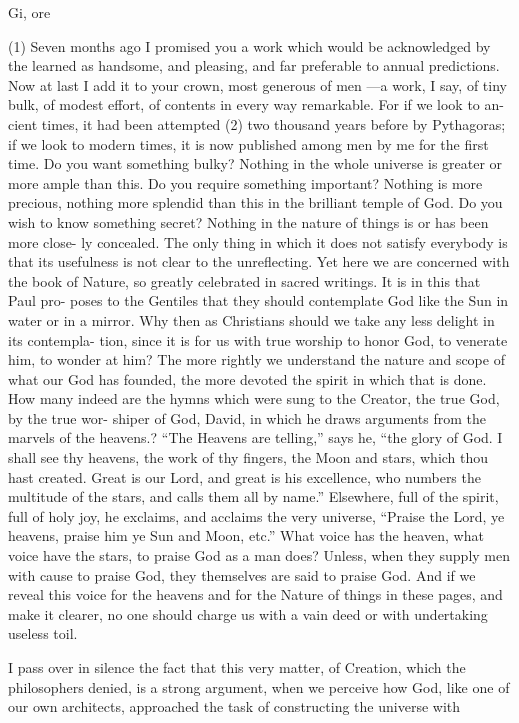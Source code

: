 \documentclass{article}
\begin{document}
{{{{{Gi, ore






(1) Seven months ago I promised you a work which would be acknowledged by
the learned as handsome, and pleasing, and far preferable to annual predictions.
Now at last I add it to your crown, most generous of men —a work, I say, of tiny
bulk, of modest effort, of contents in every way remarkable. For if we look to an-
cient times, it had been attempted (2) two thousand years before by Pythagoras; if
we look to modern times, it is now published among men by me for the first time.
Do you want something bulky? Nothing in the whole universe is greater or more
ample than this. Do you require something important? Nothing is more precious,
nothing more splendid than this in the brilliant temple of God. Do you wish to
know something secret? Nothing in the nature of things is or has been more close-
ly concealed. The only thing in which it does not satisfy everybody is that its
usefulness is not clear to the unreflecting. Yet here we are concerned with the
book of Nature, so greatly celebrated in sacred writings. It is in this that Paul pro-
poses to the Gentiles that they should contemplate God like the Sun in water or in
a mirror. Why then as Christians should we take any less delight in its contempla-
tion, since it is for us with true worship to honor God, to venerate him, to wonder
at him? The more rightly we understand the nature and scope of what our God
has founded, the more devoted the spirit in which that is done. How many indeed
are the hymns which were sung to the Creator, the true God, by the true wor-
shiper of God, David, in which he draws arguments from the marvels of the
heavens.? “The Heavens are telling,” says he, “the glory of God. I shall see thy
heavens, the work of thy fingers, the Moon and stars, which thou hast created.
Great is our Lord, and great is his excellence, who numbers the multitude of the
stars, and calls them all by name.” Elsewhere, full of the spirit, full of holy joy, he
exclaims, and acclaims the very universe, “Praise the Lord, ye heavens, praise him
ye Sun and Moon, etc.” What voice has the heaven, what voice have the stars, to
praise God as a man does? Unless, when they supply men with cause to praise
God, they themselves are said to praise God. And if we reveal this voice for the
heavens and for the Nature of things in these pages, and make it clearer, no one
should charge us with a vain deed or with undertaking useless toil.

I pass over in silence the fact that this very matter, of Creation, which the
philosophers denied, is a strong argument, when we perceive how God, like one
of our own architects, approached the task of constructing the universe with

}}}}}
\end{document}

